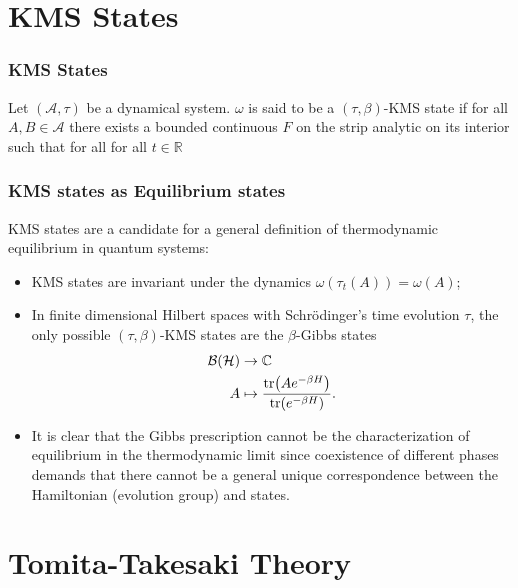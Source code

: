 \documentclass{beamer}
\begin{document}
\section{KMS States}

\begin{frame}[fragile]
	\frametitle{KMS States}
	\begin{definition}
		Let $(\mathcal{A},\tau)$ be a dynamical system. $\omega$ is said to be a $(\tau,\beta)$-KMS state if for all $A,B\in\mathcal{A}$ there exists a bounded continuous $F$ on the strip analytic on its interior such that for all for all $t\in\mathbb{R}$
		\begin{figure}
		\end{figure}
	\end{definition}
\end{frame}

\begin{frame}
	\frametitle{KMS states as Equilibrium states}	
	KMS states are a candidate for a general definition of thermodynamic equilibrium in quantum systems\cite{Haag1967}:
	\begin{itemize}
		\item KMS states are invariant under the dynamics $\omega(\tau_t(A))=\omega(A)$;
		\item In finite dimensional Hilbert spaces with Schrödinger's time evolution $\tau$, the only possible $(\tau,\beta)$-KMS states are the $\beta$-Gibbs states
		\begin{align*}
			\mathcal{B}(\mathcal{H})&\rightarrow\mathbb{C} \\
			A&\mapsto \frac{\tr(Ae^{-\beta H})}{\tr(e^{-\beta H})}.
		\end{align*}
		\item It is clear that the Gibbs prescription cannot be the characterization of equilibrium in the thermodynamic limit since coexistence of different phases demands that there cannot be a general unique correspondence between the Hamiltonian (evolution group) and states\cite{Connes1994}.
	\end{itemize}
\end{frame}

\section{Tomita-Takesaki Theory}
\end{document}

